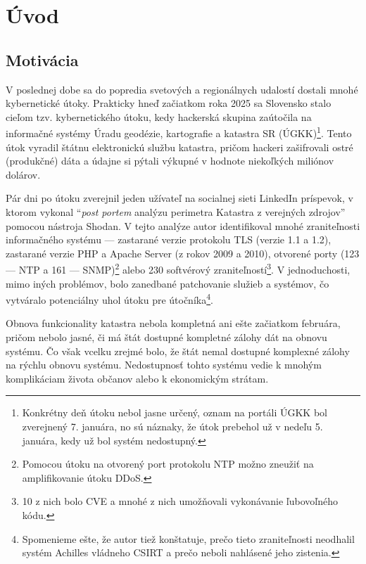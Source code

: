 \chapter*{Úvod}

\section{Motivácia}

V poslednej dobe sa do popredia svetových a regionálnych udalostí dostali mnohé kybernetické útoky. Prakticky hneď začiatkom roka 2025 sa
Slovensko stalo cieľom tzv. kybernetického útoku, kedy hackerská skupina zaútočila na informačné systémy Úradu geodézie, kartografie a katastra SR
(ÚGKK)\cite{utok_na_kataster_aktuality}\footnote{Konkrétny deň útoku nebol jasne určený, oznam na portáli ÚGKK bol zverejnený 7. januára, no sú náznaky,
že útok prebehol už v nedeľu 5. januára, kedy už bol systém nedostupný.}. Tento útok vyradil štátnu elektronickú službu katastra, pričom hackeri zašifrovali
ostré (produkčné) dáta a údajne si pýtali výkupné v hodnote niekoľkých miliónov dolárov\cite{utok_na_kataster_vykupne}.


Pár dni po útoku zverejnil jeden užívateľ na socialnej sieti LinkedIn príspevok\cite{linkedin_post_mortem_analyza_perimetra_katastra}, v ktorom vykonal
\enquote{\textit{post portem} analýzu perimetra Katastra z verejných zdrojov} pomocou nástroja Shodan. V tejto analýze autor identifikoval mnohé zraniteľnosti
informačného systému --- zastarané verzie protokolu TLS (verzie 1.1 a 1.2), zastarané verzie PHP a Apache Server (z rokov 2009 a 2010), otvorené porty
(123 --- NTP a 161 --- SNMP)\footnote{Pomocou útoku na otvorený port protokolu NTP možno zneužiť na amplifikovanie útoku DDoS.} alebo 230 softvérový
zraniteľností\footnote{10 z nich bolo CVE a mnohé z nich umožňovali vykonávanie ľubovoľného kódu.}. V jednoduchosti, mimo iných problémov,
bolo zanedbané patchovanie služieb a systémov, čo vytváralo potenciálny uhol útoku pre útočníka\footnote{Spomenieme ešte, že autor tiež konštatuje,
prečo tieto zraniteľnosti neodhalil systém Achilles vládneho CSIRT a prečo neboli nahlásené jeho zistenia.}.

Obnova funkcionality katastra nebola kompletná ani ešte začiatkom februára\cite{otvaranie_katastralnych_udajov_zive}, pričom nebolo jasné, či má štát dostupné
kompletné zálohy dát na obnovu systému. Čo však vcelku zrejmé bolo, že štát nemal dostupné komplexné zálohy na rýchlu obnovu systému. Nedostupnosť tohto systému vedie
k mnohým komplikáciam života občanov alebo k ekonomickým strátam.


